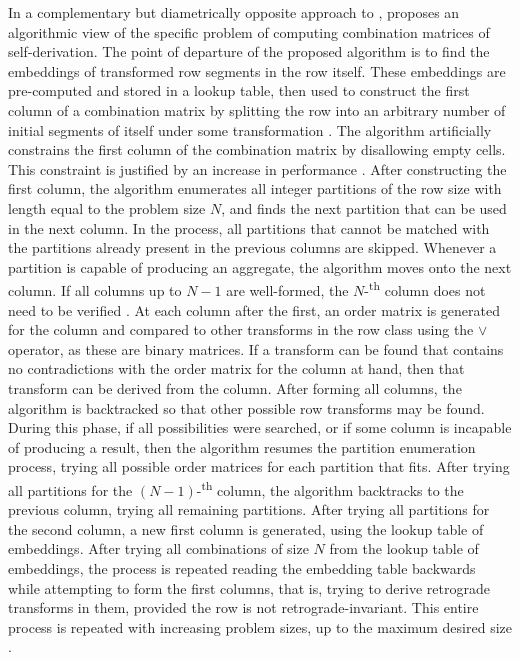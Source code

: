 \vspace{12pt}

In a complementary but diametrically opposite approach to \cite{Starr1984}, \cite{Kowalski1987b} proposes an algorithmic view of the specific problem of computing combination matrices of self-derivation. The point of departure of the proposed algorithm is to find the embeddings of transformed row segments in the row itself. These embeddings are pre-computed and stored in a lookup table, then used to construct the first column of a combination matrix by splitting the row into an arbitrary number of initial segments of itself under some transformation \cite[29]{Kowalski1987b}. The algorithm artificially constrains the first column of the combination matrix by disallowing empty cells. This constraint is justified by an increase in performance \cite[30]{Kowalski1987b}. After constructing the first column, the algorithm enumerates all integer partitions of the row size with length equal to the problem size $N$, and finds the next partition that can be used in the next column. In the process, all partitions that cannot be matched with the partitions already present in the previous columns are skipped. Whenever a partition is capable of producing an aggregate, the algorithm moves onto the next column. If all columns up to $N - 1$ are well-formed, the $N$-\textsuperscript{th} column does not need to be verified \cite[31]{Kowalski1987b}. At each column after the first, an order matrix is generated for the column and compared to other transforms in the row class using the $\lor$ operator, as these are binary matrices. If a transform can be found that contains no contradictions with the order matrix for the column at hand, then that transform can be derived from the column. After forming all columns, the algorithm is backtracked so that other possible row transforms may be found. During this phase, if all possibilities were searched, or if some column is incapable of producing a result, then the algorithm resumes the partition enumeration process, trying all possible order matrices for each partition that fits. After trying all partitions for the $(N - 1)$-\textsuperscript{th} column, the algorithm backtracks to the previous column, trying all remaining partitions. After trying all partitions for the second column, a new first column is generated, using the lookup table of embeddings. After trying all combinations of size $N$ from the lookup table of embeddings, the process is repeated reading the embedding table backwards while attempting to form the first columns, that is, trying to derive retrograde transforms in them, provided the row is not retrograde-invariant. This entire process is repeated with increasing problem sizes, up to the maximum desired size \cite[32]{Kowalski1987b}.

